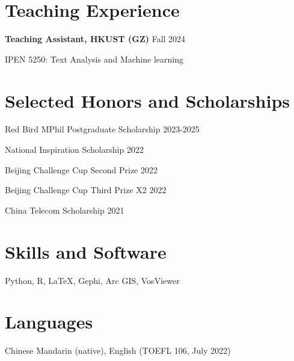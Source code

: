 \documentclass[letterpaper, 11pt]{article}
\begin{document}
\section{Teaching Experience}
\textbf{Teaching Assistant, HKUST (GZ)} \hfill Fall 2024

IPEN 5250: Text Analysis and Machine learning

\section{Selected Honors and Scholarships}
Red Bird MPhil Postgraduate Scholarship \hfill 2023-2025

National Inspiration Scholarship \hfill 2022

Beijing Challenge Cup Second Prize \hfill 2022

Beijing Challenge Cup Third Prize X2 \hfill 2022

China Telecom Scholarship \hfill 2021

\section{Skills and Software}
Python, R, \LaTeX, Gephi, Arc GIS, VosViewer

\section{Languages}
Chinese Mandarin (native), English (TOEFL 106, July 2022)
\end{document}

